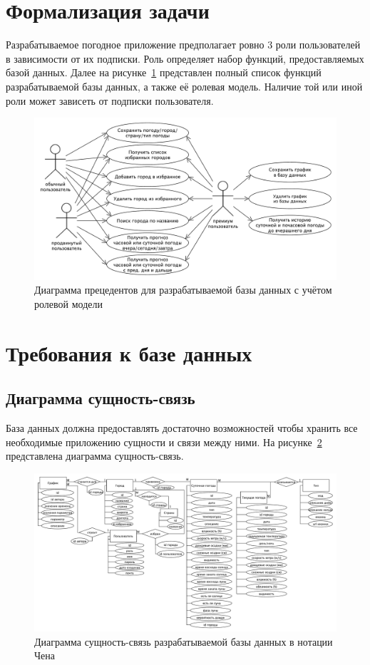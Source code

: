 \section{Формализация задачи}
Разрабатываемое погодное приложение предполагает ровно $3$ роли пользователей в зависимости от их подписки.
Роль определяет набор функций, предоставляемых базой данных.
Далее на рисунке~\ref{fig:use-case} представлен полный список функций разрабатываемой базы данных, а также её ролевая модель.
Наличие той или иной роли может зависеть от подписки пользователя.

\begin{figure}[H]
	\centering
	\includegraphics[width=\textwidth]{tools/img/db_usecase.pdf}
	\caption{
        Диаграмма прецедентов для разрабатываемой базы данных с учётом ролевой модели
    }
	\label{fig:use-case}
\end{figure}

\section{Требования к базе данных}

\subsection*{Диаграмма сущность-связь}
База данных должна предоставлять достаточно возможностей чтобы хранить все необходимые приложению сущности и связи между ними.
На рисунке~\ref{fig:er-chen} представлена диаграмма сущность-связь.
\begin{figure}[H]
	\centering
	\includegraphics[width=\textwidth]{tools/img/er-chen.pdf}
	\caption{
        Диаграмма сущность-связь разрабатываемой базы данных в нотации Чена
    }
	\label{fig:er-chen}
\end{figure}

